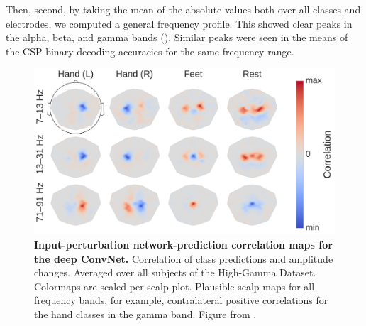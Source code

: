     Then, second, by taking the mean of the absolute values both over all
classes and electrodes, we computed a general frequency profile. This
showed clear peaks in the alpha, beta, and gamma bands
(). Similar peaks were seen in
the means of the CSP binary decoding accuracies for the same frequency
range.


\begin{figure}[htb]
    \myfloatalign
    \includegraphics[width=1\linewidth]{images/Bandpower_Perturbation.ipynb.3.pdf-1.png}
    
    \caption[Amplitude perturbation correlation scalp plots on high-gamma dataset]{
\textbf{Input-perturbation network-prediction correlation maps for the
deep ConvNet.} Correlation of class predictions and amplitude changes.
Averaged over all subjects of the High-Gamma Dataset. Colormaps are
scaled per scalp plot. Plausible scalp maps for all frequency bands, for
example, contralateral positive correlations for the hand classes in the
gamma band. Figure from \citet{schirrmeisterdeephbm2017}.
}
\label{bandpower-perturbation-topo-fig}
\end{figure}




